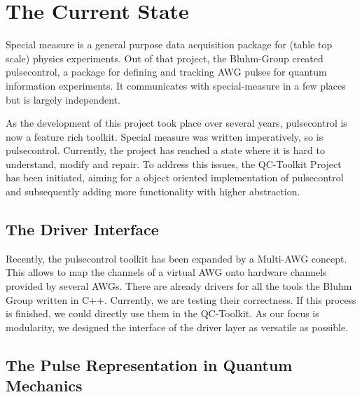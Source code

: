 \documentclass[a4paper,12pt]{article}
\begin{document}
 
\section{The Current State}

Special measure is a general purpose data acquisition package for (table top scale) physics experiments. Out of that project, the Bluhm-Group created pulsecontrol, a package for defining and tracking AWG pulses for quantum information experiments. It communicates with special-measure in a few places but is largely independent. 

As the development of this project took place over several years, pulsecontrol is now a feature rich toolkit. Special measure was written imperatively, so is pulsecontrol. Currently, the project has reached a state where it is hard to understand, modify and repair. 
To address this issues, the QC-Toolkit Project has been initiated, aiming for a object oriented implementation of pulsecontrol and subsequently adding more functionality with higher abstraction.

\subsection{The Driver Interface}
Recently, the pulsecontrol toolkit has been expanded by a Multi-AWG concept. This allows to map the channels of a virtual AWG onto hardware channels provided by several AWGs.
There are already drivers for all the tools the Bluhm Group written in C++. Currently, we are testing their correctness. If this process is finished, we could directly use them in the QC-Toolkit. 
As our focus is modularity, we designed the interface of the driver layer as versatile as possible.

\subsection{The Pulse Representation in Quantum Mechanics}
\end{document}
